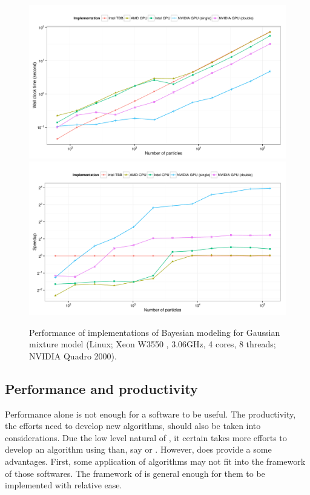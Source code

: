 \begin{figure}
  \centering
  \includegraphics[width=\linewidth]{fig/bench-ocl-time-running}
  \includegraphics[width=\linewidth]{fig/bench-ocl-speedup-running}
  \caption[Performance of \protect\vsmc \protect\opencl implementations]
  {Performance of \opencl implementations of Bayesian modeling for
    Gaussian mixture model (Linux; Xeon W3550 \gpu, 3.06GHz, 4 cores, 8
    threads; NVIDIA Quadro 2000).}
  \label{fig:bench-ocl-perf}
\end{figure}

\subsection{Performance and productivity}
\label{sub:Performance and productivity}

Performance alone is not enough for a software to be useful. The productivity,
the efforts need to develop new algorithms, should also be taken into
considerations. Due the low level natural of \cpp, it certain takes more
efforts to develop an algorithm using \vsmc than, say \libbi or \biips.
However, \smc does provide a some advantages. First, some application of \smc
algorithms may not fit into the framework of those softwares. The framework of
\smc is general enough for them to be implemented with relative ease.

